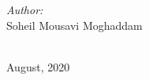 \documentclass[12pt]{article}
\begin{document}
\begin{titlepage}
\begin{minipage}{0.5\textwidth}
\begin{flushleft} \large
\emph{Author:}\\
Soheil Mousavi Moghaddam\\ %
\end{flushleft}

\end{minipage}\\[2cm]



{\large August, 2020}\\[2cm] %

\vfill %

\end{titlepage}
\end{document}
